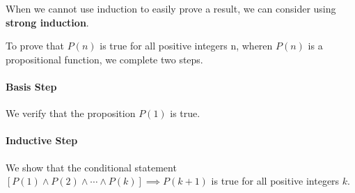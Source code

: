 When we cannot use induction to easily prove a result, we can consider using \textbf{strong induction}.

To prove that \( P(n) \) is true for all positive integers n, wheren \( P(n) \) is a propositional function, we complete two steps.

\paragraph{Basis Step}We verify that the proposition \( P(1) \) is true.

\paragraph{Inductive Step} We show that the conditional statement \( [P(1) \wedge P(2) \wedge \cdots \wedge P(k)] \implies P(k+1) \) is true for all positive integers \( k \). 